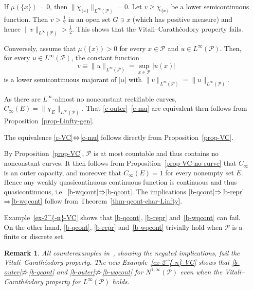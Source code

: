 \documentclass[a4paper,twoside]{article}
\makeatletter
\theoremstyle{propositional}
\theoremstyle{descriptive}
\newtheorem{remark}[thm]{Remark}
\renewenvironment{proof}[1][\proofname]{\par
  \pushQED{\qed}%
  \normalfont
  \trivlist
  \item[\hskip\labelsep
        \itshape
    #1\@addpunct{.}]\ignorespaces
}{%
  \popQED\endtrivlist\@endpefalse
} \makeatother
\newcommand{\Cinfty}{{C_\infty}}
\newcommand{\NinftyP}{N^{1,\infty}(\P)}
\renewcommand{\P}{\mathcal{P}}
\numberwithin{equation}{section}
\newcommand{\eqv}{\ensuremath{
\mathchoice{\ \Longleftrightarrow \ }{\Leftrightarrow}
                {\Leftrightarrow}{\Leftrightarrow}}}
\newcommand{\imp}{\ensuremath{
\mathchoice{\ \Longrightarrow \ }{\Rightarrow}
                {\Rightarrow}{\Rightarrow}}}
\newcommand{\negimp}{\ensuremath{\textstyle\kern 0em \not\kern 0em\Rightarrow}}
\makeatother
\begin{document}
\begin{proof}[Proof of Proposition~\ref{prop-VC}]
If $\mu(\{x\})=0$, then $\|\chi_{\{x\}}\|_{L^\infty(\P)} =0$.
Let $v\ge \chi_{\{x\}}$ be a lower semicontinuous function.
Then $v>\tfrac12$  in an open set $G\ni x$ (which has positive measure) and hence 
$\|v\|_{L^\infty(\P)}> \tfrac12$.
This shows that the Vitali--Carath\'eodory property fails.

Conversely, assume that $\mu(\{x\})>0$ for every $x\in\P$ and $u\in L^\infty(\P)$.
Then, for every $u\in  L^\infty(\P)$, the constant function
\[
v \equiv \|u\|_{L^\infty(\P)} = \sup_{x\in \P} |u(x)|
\]
is a lower semicontinuous 
majorant of $|u|$ with $\|v\|_{L^\infty(\P)} = \|u\|_{L^\infty(\P)}$.
\end{proof}

\begin{proof}[Proof of Proposition~\ref{prop-VC-no-curve}]
As there are 
$L^\infty$-almost no nonconstant rectifiable curves,
$\Cinfty(E)=\|\chi_E\|_{L^\infty(\P)}$.
That \ref{c-outer}--\ref{c-mu} are equivalent
then follows from Proposition~\ref{prop-Linfty-gen}.

The equivalence \ref{c-VC}\eqv\ref{c-mu}
follows directly from Proposition~\ref{prop-VC}.
\end{proof}

\begin{proof}[Proof of Theorem~\ref{thm-main}]
By Proposition~\ref{prop-VC}, $\P$ is at most  countable
and thus contains no nonconstant curves.
It then follows from Proposition~\ref{prop-VC-no-curve}
that $\Cinfty$ is an outer capacity,
and moreover that 
$\Cinfty(E)=1$ for every nonempty set $E$.
Hence any weakly quasicontinuous continuous function is continuous
and thus quasicontinuous, i.e.\ 
\ref{b-wqcont}\imp\ref{b-qcont}.
The implications
\ref{b-qcont}\imp\ref{b-repr}\imp\ref{b-wqcont} follow
from Theorem~\ref{thm-qcont-char-Linfty}.

Example~\ref{ex-2^{-n}-VC} shows that 
\ref{b-qcont}, \ref{b-repr} and~\ref{b-wqcont} can fail.
On the other hand, \ref{b-qcont}, \ref{b-repr} and~\ref{b-wqcont}
trivially hold when $\P$ is a finite or discrete  set.
\end{proof}

\begin{remark} \label{rmk-1.4}
All counterexamples in~\cite{BBLMaly}, showing 
the negated implications, fail the Vitali--Carath\'eodory property.
The new Example~\ref{ex-2^{-n}-VC}
shows that 
\ref{b-outer}\negimp\ref{b-qcont} and
\ref{b-outer}\negimp\ref{b-wqcont} 
for $\NinftyP$
even when the Vitali--Ca\-ra\-th\'eo\-do\-ry property for $L^\infty(\P)$ holds.
\end{remark}
\end{document}

